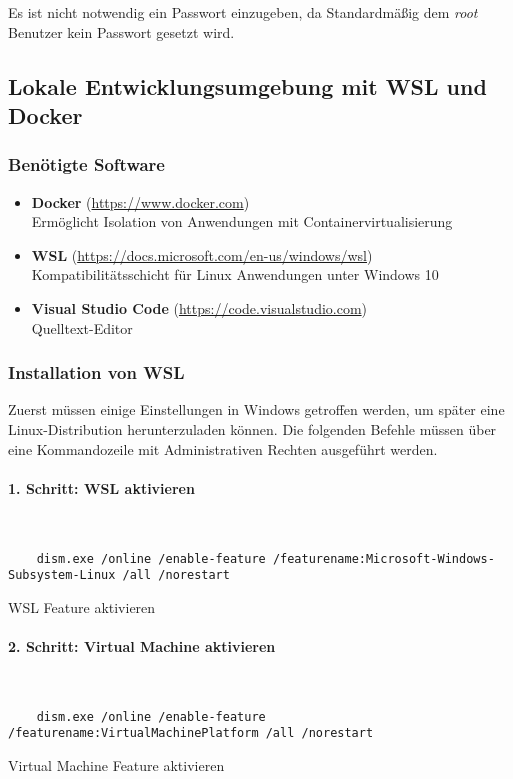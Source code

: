 Es ist nicht notwendig ein Passwort einzugeben, da Standardmäßig dem
\textit{root} Benutzer kein Passwort gesetzt wird.

\subsection{Lokale Entwicklungsumgebung mit WSL und Docker}

\subsubsection{Benötigte Software}

\begin{itemize}
  \item \textbf{Docker} (\url{https://www.docker.com}) \\ Ermöglicht Isolation
        von Anwendungen mit Containervirtualisierung
  \item \textbf{WSL} (\url{https://docs.microsoft.com/en-us/windows/wsl}) \\
        Kompatibilitätsschicht für Linux Anwendungen unter Windows 10
  \item \textbf{Visual Studio Code} (\url{https://code.visualstudio.com}) \\
        Quelltext-Editor
\end{itemize}

\subsubsection{Installation von WSL}
Zuerst müssen einige Einstellungen in Windows getroffen werden, um später eine
Linux-Distribution herunterzuladen können. Die folgenden Befehle müssen über eine
Kommandozeile mit Administrativen Rechten ausgeführt werden.


\paragraph{1. Schritt: WSL aktivieren}\mbox{}\\
\begin{listing}[H]
  \begin{verbatim}
    dism.exe /online /enable-feature /featurename:Microsoft-Windows-Subsystem-Linux /all /norestart
  \end{verbatim}
  \caption{WSL Feature aktivieren}
\end{listing}

\paragraph{2. Schritt: Virtual Machine aktivieren}\mbox{}\\
\begin{listing}[H]
  \begin{verbatim}
    dism.exe /online /enable-feature /featurename:VirtualMachinePlatform /all /norestart
  \end{verbatim}
  \caption{Virtual Machine Feature aktivieren}
\end{listing}

